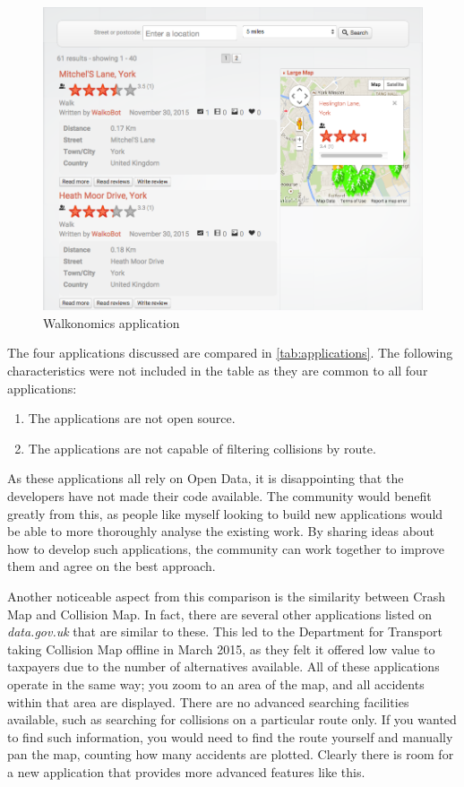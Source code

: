 \documentclass[authoryearcitations]{UoYCSproject}
\begin{document}
\begin{figure}
	\includegraphics[scale=0.4]{walkonomics}
	\caption{Walkonomics application}
	\label{fig:walkonomics}
\end{figure}

The four applications discussed are compared in \autoref{tab:applications}. The following characteristics were not included in the table as they are common to all four applications:

\begin{enumerate}
  \item The applications are not open source.
  \item The applications are not capable of filtering collisions by route.
\end{enumerate}

As these applications all rely on Open Data, it is disappointing that the developers have not made their code available. The community would benefit greatly from this, as people like myself looking to build new applications would be able to more thoroughly analyse the existing work. By sharing ideas about how to develop such applications, the community can work together to improve them and agree on the best approach.

Another noticeable aspect from this comparison is the similarity between Crash Map and Collision Map. In fact, there are several other applications listed on \textit{data.gov.uk} that are similar to these. This led to the Department for Transport taking Collision Map offline in March 2015, as they felt it offered low value to taxpayers due to the number of alternatives available.  All of these applications operate in the same way; you zoom to an area of the map, and all accidents within that area are displayed. There are no advanced searching facilities available, such as searching for collisions on a particular route only. If you wanted to find such information, you would need to find the route yourself and manually pan the map, counting how many accidents are plotted. Clearly there is room for a new application that provides more advanced features like this.  
\end{document}
